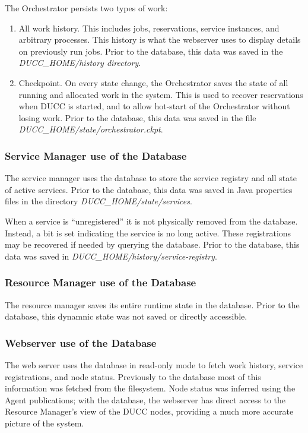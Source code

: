     The Orchestrator persists two types of work:
    \begin{enumerate}
      \item All work history.  This includes jobs, reservations, service instances, and 
        arbitrary processes.  This history is what the webserver uses to display details
        on previously run jobs.  Prior to the database, this data was saved in the
        {\em DUCC\_HOME/history directory}.
      \item Checkpoint.  On every state change, the Orchestrator saves the state of 
        all running and allocated work in the system.  This is used to recover reservations
        when DUCC is started, and to allow hot-start of the Orchestrator without losing work.
        Prior to the database, this data was saved in the file {\em DUCC\_HOME/state/orchestrator.ckpt}.
    \end{enumerate}
    
    \subsubsection{Service Manager use of the Database}
    The service manager uses the database to store the service registry and all state
    of active services.  Prior to the database, this data was saved in Java properties files
    in the directory {\em DUCC\_HOME/state/services}.

    When a service is ``unregistered'' it is not physically removed from the database.  Instead,
    a bit is set indicating the service is no long active.  These registrations may be
    recovered if needed by querying the database.  Prior to the database, this data was saved
    in {\em DUCC\_HOME/history/service-registry}.

    \subsubsection{Resource Manager use of the Database}
    The resource manager saves its entire runtime state in the database.  Prior to the
    database, this dynamnic state was not saved or directly accessible.

    \subsubsection{Webserver use of the Database}
    The web server uses the database in read-only mode to fetch work history, service
    registrations, and node status.  Previously to the database most of this information
    was fetched from the filesystem.  Node status was inferred using the Agent publications;
    with the database, the webserver has direct access to the Resource Manager's view of the
    DUCC nodes, providing a much more accurate picture of the system.
  
